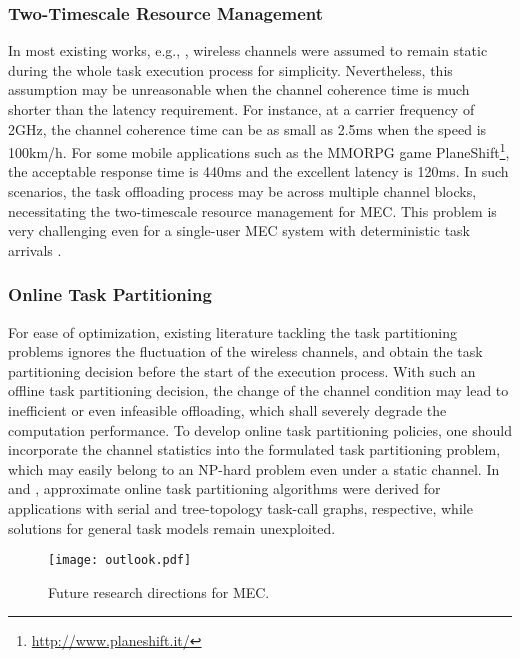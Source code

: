 \documentclass[journal]{IEEEtran}
\begin{document}
{\subsubsection{\textbf{Two-Timescale Resource Management}} In most existing works, e.g., \cite{BarbarossaMSP1411,chen2015efficient,Munoz1510,Sardellitti1506,lyumulti:2016:ProxiCloud,yu2016joint}, wireless channels were assumed to remain static during the whole task execution process for simplicity. Nevertheless, this assumption may be unreasonable when the channel coherence time is much shorter than the latency requirement. For instance, at a carrier frequency of 2GHz, the channel coherence time can be as small as 2.5ms when the speed is 100km\slash h. For some mobile applications such as the MMORPG game PlaneShift\footnote{\url{http://www.planeshift.it/}}, the acceptable response time is 440ms and the excellent latency is 120ms\cite{SWang0912}. In such scenarios, the task offloading process may be across multiple channel blocks, necessitating the two-timescale resource management  for MEC. This problem is very challenging even for a single-user MEC system with deterministic task arrivals \cite{WZhangTWC1312}.


\subsubsection{\textbf{Online Task Partitioning}} For ease of optimization, existing literature tackling the task partitioning problems ignores the fluctuation of the wireless channels, and obtain the task partitioning decision before the start of the execution process. With such an offline task partitioning decision, the change of the channel condition may lead to inefficient or even infeasible offloading, which shall severely degrade the computation performance. To develop online task partitioning policies, one should incorporate the channel statistics into the formulated task partitioning problem, which may easily belong to an NP-hard problem even under a static channel. In \cite{WZhangTWC1501} and \cite{SWangIEEEAcess1702}, approximate online task partitioning algorithms were derived for applications with serial and tree-topology task-call graphs, respective, while solutions for general task models remain unexploited.

\begin{figure*}[!t]
\begin{center}
   \texttt{[image: outlook.pdf]}
\end{center}
\caption{Future research directions for MEC.}
\label{OutlookTree}
\end{figure*}
}
\end{document}

